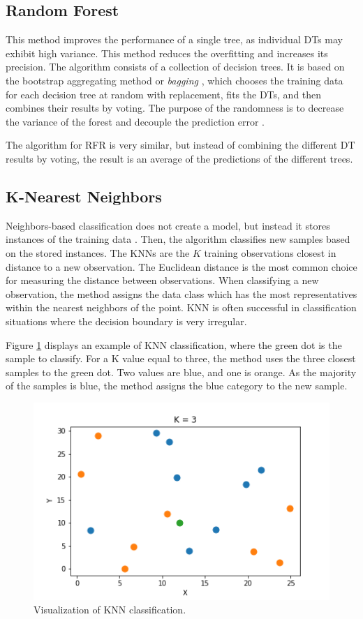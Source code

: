 \subsection{Random Forest}


This method improves the performance of a single tree, as individual DTs may exhibit high variance.
This method reduces the overfitting and increases its precision.
The algorithm consists of a collection of decision trees.
It is based on the bootstrap aggregating method or \textit{bagging} \cite{breiman_bagging_1996}, which chooses the training data for each decision tree at random with replacement, fits the \glspl*{DT}, and then combines their results by voting.
The purpose of the randomness is to decrease the variance of the forest and decouple the prediction error \cite{pedregosa_scikit-learn_2011}.

The algorithm for \gls*{RFR} is very similar, but instead of combining the different DT results by voting, the result is an average of the predictions of the different trees.


\subsection{K-Nearest Neighbors}


Neighbors-based classification does not create a model, but instead it stores instances of the training data \cite{pedregosa_scikit-learn_2011}.
Then, the algorithm classifies new samples based on the stored instances.
The KNNs are the $K$ training observations closest in distance to a new observation.
The Euclidean distance is the most common choice for measuring the distance between observations.
When classifying a new observation, the method assigns the data class which has the most representatives within the nearest neighbors of the point.
\gls*{KNN} is often successful in classification situations where the decision boundary is very irregular.

Figure \ref{fig:knn} displays an example of KNN classification, where the green dot is the sample to classify.
For a K value equal to three, the method uses the three closest samples to the green dot.
Two values are blue, and one is orange.
As the majority of the samples is blue, the method assigns the blue category to the new sample.

\begin{figure}[htbp!] %
  \centering
  \includegraphics[width=0.5\linewidth]{figures/knns}
  \caption{Visualization of KNN classification.}
  \label{fig:knn}
\end{figure}

